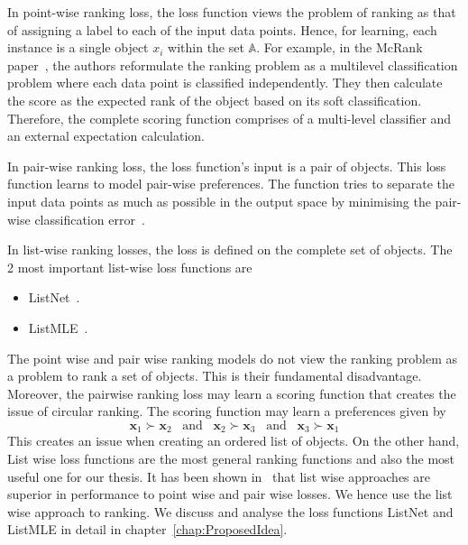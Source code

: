 \documentclass[11pt]{report}
\begin{document}
In point-wise ranking loss,  the loss function views the problem of ranking as that of assigning a label to each of the input data points.
Hence,  for learning,  each instance is a single object $x_i$ within the set $\mathbb{A}$.
For example,  in the McRank paper~\cite{McRank},  the authors reformulate the ranking problem as a multilevel classification problem where each data point is classified independently.
They then calculate the score as the expected rank of the object based on its soft classification.
Therefore, the complete scoring function comprises of a multi-level classifier and an external expectation calculation.

In pair-wise ranking loss,  the loss function's input is a pair of objects.
This loss function learns to model pair-wise preferences.
The function tries to separate the input data points as much as possible in the output space by minimising the pair-wise classification error~\cite{pairwisepreferencespaper}.

In list-wise ranking losses,  the loss is defined on the complete set of objects.
The 2 most important list-wise loss functions are
\begin{itemize}
\item ListNet~\cite{listwisebetter}.
\item ListMLE~\cite{listmlepaper}.
\end{itemize}

The point wise and pair wise ranking models do not view the ranking problem as a problem to rank a set of 
objects.
This is their fundamental disadvantage.
Moreover,  the pairwise ranking loss may learn a scoring function that creates the issue of circular ranking.
The scoring function may learn a preferences given by
$$
\textbf{x}_1 \succ  \textbf{x}_2 \;\;\; \textrm{and} \;\;\;  \textbf{x}_2 \succ  \textbf{x}_3 \;\;\; \textrm{and} \;\;\;  \textbf{x}_3 \succ  \textbf{x}_1
$$
This creates an issue when creating an ordered list of objects.
On the other hand,  List wise loss functions are the most general ranking functions and also the most useful one for our thesis.
It has been shown in~\cite{listwisebetter} that list wise approaches are superior in performance to point wise and pair wise losses.
We hence use the list wise approach to ranking.
We discuss and analyse the loss functions ListNet and ListMLE in detail in chapter~\ref{chap:ProposedIdea}.

\end{document}
